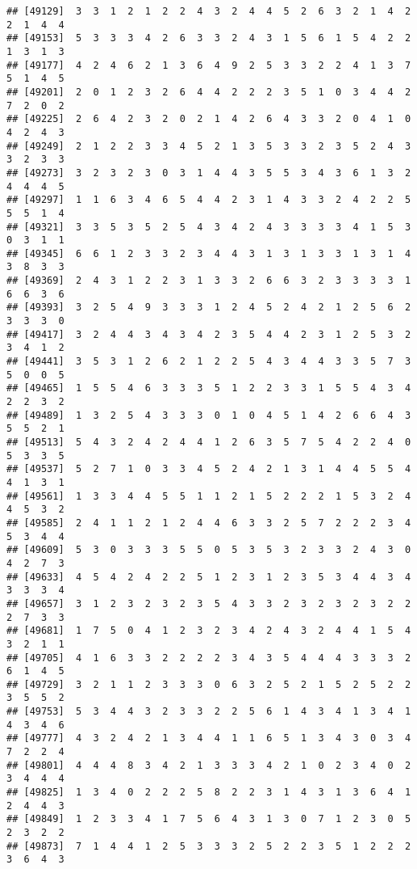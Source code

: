 \documentclass[
]{article}
\begin{document}
\begin{verbatim}
## [49129]  3  3  1  2  1  2  2  4  3  2  4  4  5  2  6  3  2  1  4  2  2  1  4  4
## [49153]  5  3  3  3  4  2  6  3  3  2  4  3  1  5  6  1  5  4  2  2  1  3  1  3
## [49177]  4  2  4  6  2  1  3  6  4  9  2  5  3  3  2  2  4  1  3  7  5  1  4  5
## [49201]  2  0  1  2  3  2  6  4  4  2  2  2  3  5  1  0  3  4  4  2  7  2  0  2
## [49225]  2  6  4  2  3  2  0  2  1  4  2  6  4  3  3  2  0  4  1  0  4  2  4  3
## [49249]  2  1  2  2  3  3  4  5  2  1  3  5  3  3  2  3  5  2  4  3  3  2  3  3
## [49273]  3  2  3  2  3  0  3  1  4  4  3  5  5  3  4  3  6  1  3  2  4  4  4  5
## [49297]  1  1  6  3  4  6  5  4  4  2  3  1  4  3  3  2  4  2  2  5  5  5  1  4
## [49321]  3  3  5  3  5  2  5  4  3  4  2  4  3  3  3  3  4  1  5  3  0  3  1  1
## [49345]  6  6  1  2  3  3  2  3  4  4  3  1  3  1  3  3  1  3  1  4  3  8  3  3
## [49369]  2  4  3  1  2  2  3  1  3  3  2  6  6  3  2  3  3  3  3  1  6  6  3  6
## [49393]  3  2  5  4  9  3  3  3  1  2  4  5  2  4  2  1  2  5  6  2  3  3  3  0
## [49417]  3  2  4  4  3  4  3  4  2  3  5  4  4  2  3  1  2  5  3  2  3  4  1  2
## [49441]  3  5  3  1  2  6  2  1  2  2  5  4  3  4  4  3  3  5  7  3  5  0  0  5
## [49465]  1  5  5  4  6  3  3  3  5  1  2  2  3  3  1  5  5  4  3  4  2  2  3  2
## [49489]  1  3  2  5  4  3  3  3  0  1  0  4  5  1  4  2  6  6  4  3  5  5  2  1
## [49513]  5  4  3  2  4  2  4  4  1  2  6  3  5  7  5  4  2  2  4  0  5  3  3  5
## [49537]  5  2  7  1  0  3  3  4  5  2  4  2  1  3  1  4  4  5  5  4  4  1  3  1
## [49561]  1  3  3  4  4  5  5  1  1  2  1  5  2  2  2  1  5  3  2  4  4  5  3  2
## [49585]  2  4  1  1  2  1  2  4  4  6  3  3  2  5  7  2  2  2  3  4  5  3  4  4
## [49609]  5  3  0  3  3  3  5  5  0  5  3  5  3  2  3  3  2  4  3  0  4  2  7  3
## [49633]  4  5  4  2  4  2  2  5  1  2  3  1  2  3  5  3  4  4  3  4  3  3  3  4
## [49657]  3  1  2  3  2  3  2  3  5  4  3  3  2  3  2  3  2  3  2  2  2  7  3  3
## [49681]  1  7  5  0  4  1  2  3  2  3  4  2  4  3  2  4  4  1  5  4  3  2  1  1
## [49705]  4  1  6  3  3  2  2  2  2  3  4  3  5  4  4  4  3  3  3  2  6  1  4  5
## [49729]  3  2  1  1  2  3  3  3  0  6  3  2  5  2  1  5  2  5  2  2  3  5  5  2
## [49753]  5  3  4  4  3  2  3  3  2  2  5  6  1  4  3  4  1  3  4  1  4  3  4  6
## [49777]  4  3  2  4  2  1  3  4  4  1  1  6  5  1  3  4  3  0  3  4  7  2  2  4
## [49801]  4  4  4  8  3  4  2  1  3  3  3  4  2  1  0  2  3  4  0  2  3  4  4  4
## [49825]  1  3  4  0  2  2  2  5  8  2  2  3  1  4  3  1  3  6  4  1  2  4  4  3
## [49849]  1  2  3  3  4  1  7  5  6  4  3  1  3  0  7  1  2  3  0  5  2  3  2  2
## [49873]  7  1  4  4  1  2  5  3  3  3  2  5  2  2  3  5  1  2  2  2  3  6  4  3

\end{verbatim}
\end{document}
